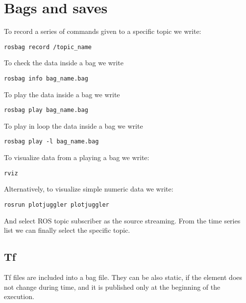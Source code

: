 \section{Bags and saves}

To record a series of commands given to a specific topic we write: 
\begin{verbatim}
rosbag record /topic_name
\end{verbatim}

To check the data inside a bag we write 
\begin{verbatim}
rosbag info bag_name.bag
\end{verbatim}

To play the data inside a bag we write 
\begin{verbatim}
rosbag play bag_name.bag
\end{verbatim}

To play in loop the data inside a bag we write 
\begin{verbatim}
rosbag play -l bag_name.bag
\end{verbatim}

To visualize data from a playing a bag we write: 
\begin{verbatim}
rviz
\end{verbatim}
Alternatively, to visualize simple numeric data we write: 
\begin{verbatim}
rosrun plotjuggler plotjuggler
\end{verbatim}
And select ROS topic subscriber as the source streaming. 
From the time series list we can finally select the specific topic. 

\subsection{Tf}
Tf files are included into a bag file. 
They can be also static, if the element does not change during time, and it is published only at the beginning of the execution. 
